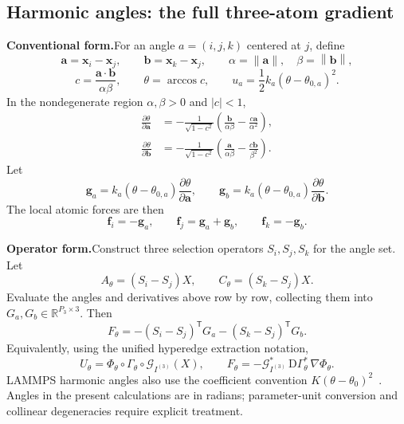 \documentclass[11pt,a4paper]{article}
\newcommand{\oldform}{\par\noindent\textbf{Conventional form.}\quad}
\newcommand{\newform}{\par\noindent\textbf{Operator form.}\quad}
\newcommand{\RR}{\mathbb R}
\newcommand{\norm}[1]{\left\lVert #1\right\rVert}
\newcommand{\vect}[1]{\bm{#1}}
\theoremstyle{definition}
\begin{document}
\subsection{Harmonic angles: the full three-atom gradient}
\oldform For an angle $a=(i,j,k)$ centered at $j$, define
\begin{equation}
\vect a=\vect x_i-\vect x_j,\qquad
\vect b=\vect x_k-\vect x_j,\qquad
\alpha=\norm{\vect a},\quad\beta=\norm{\vect b},
\end{equation}
\begin{equation}
c=\frac{\vect a\cdot\vect b}{\alpha\beta},\qquad
\theta=\arccos c,\qquad
u_a=\frac12k_a(\theta-\theta_{0,a})^2.
\end{equation}
In the nondegenerate region $\alpha,\beta>0$ and $|c|<1$,
\begin{align}
\frac{\partial\theta}{\partial\vect a}
&=-\frac1{\sqrt{1-c^2}}
\left(\frac{\vect b}{\alpha\beta}-\frac{c\vect a}{\alpha^2}\right),\\
\frac{\partial\theta}{\partial\vect b}
&=-\frac1{\sqrt{1-c^2}}
\left(\frac{\vect a}{\alpha\beta}-\frac{c\vect b}{\beta^2}\right).
\end{align}
Let
\begin{equation}
\vect g_a=k_a(\theta-\theta_{0,a})\frac{\partial\theta}{\partial\vect a},
\qquad
\vect g_b=k_a(\theta-\theta_{0,a})\frac{\partial\theta}{\partial\vect b}.
\end{equation}
The local atomic forces are then
\begin{equation}
\vect f_i=-\vect g_a,\qquad
\vect f_j=\vect g_a+\vect g_b,\qquad
\vect f_k=-\vect g_b.
\label{eq:angle-local-forces-app}
\end{equation}

\newform Construct three selection operators $S_i,S_j,S_k$ for the angle set. Let
\begin{equation}
A_\theta=(S_i-S_j)X,\qquad
C_\theta=(S_k-S_j)X.
\end{equation}
Evaluate the angles and derivatives above row by row, collecting them into
$G_a,G_b\in\RR^{P_3\times3}$. Then
\begin{equation}
F_\theta=-(S_i-S_j)^{\mathsf T}G_a
-(S_k-S_j)^{\mathsf T}G_b.
\label{eq:angle-tensor-app}
\end{equation}
Equivalently, using the unified hyperedge extraction notation,
\begin{equation}
U_\theta=\Phi_\theta\circ\Gamma_\theta\circ\mathcal G_{I^{(3)}}(X),
\qquad
F_\theta=-\mathcal G_{I^{(3)}}^*\,
\mathrm D\Gamma_\theta^*\,\nabla\Phi_\theta.
\end{equation}
LAMMPS harmonic angles also use the coefficient convention
$K(\theta-\theta_0)^2$~\cite{lammps-angle}. Angles in the present calculations are in radians;
parameter-unit conversion and collinear degeneracies require explicit treatment.
\end{document}
